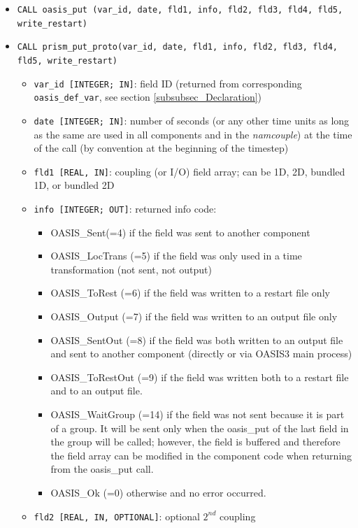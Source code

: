 \begin{itemize}
\item {\tt CALL oasis\_put (var\_id, date, fld1, info, fld2, fld3,
    fld4, fld5, write\_restart)}
\item {\tt CALL prism\_put\_proto(var\_id, date, fld1, info, fld2,
    fld3, fld4, fld5, write\_restart)}
  \begin{itemize}
  \item {\tt var\_id [INTEGER; IN]}: field ID (returned from corresponding {\tt
      oasis\_def\_var}, see section \ref{subsubsec_Declaration})
  \item {\tt date [INTEGER; IN]}: number of seconds (or any other time
    units as long as the same are used in all components and in the {\it
      namcouple}) at the time of the call (by convention at the
    beginning of the timestep)
  \item {\tt fld1 [REAL, IN]}: coupling (or I/O) field array; can be
    1D, 2D, bundled 1D, or bundled 2D 
  \item {\tt info [INTEGER; OUT]}: returned info code:
    \begin{itemize}
    \item OASIS\_Sent(=4) if the field was sent to another component
    \item OASIS\_LocTrans (=5) if the field was only used in a time
      transformation (not sent, not output)
    \item OASIS\_ToRest (=6) if the field was written to a restart
      file only
    \item OASIS\_Output (=7) if the field was written to an output
      file only
    \item OASIS\_SentOut (=8) if the field was both written to an
      output file and sent to another component (directly or via OASIS3
      main process)
    \item OASIS\_ToRestOut (=9) if the field was written both to a
      restart file and to an output file.
    \item OASIS\_WaitGroup (=14) if the field was not sent because it is part of a group.
    It will be sent only when the oasis\_put of the last field in the group will be called; however, the field is buffered and therefore the field array can be modified in the component code when returning from the oasis\_put call.
    \item OASIS\_Ok (=0) otherwise and no error occurred.
    \end{itemize}
  \item {\tt fld2 [REAL, IN, OPTIONAL]}: optional $2^{nd}$ coupling

\end{itemize}
\end{itemize}
